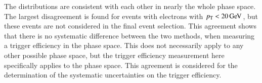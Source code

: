 The distributions are consistent with each other in nearly the whole phase space. The largest disagreement is found for events with electrons with $p_{\mathrm{T}}<20\,\text{Ge\hspace{-.08em}V}$, but these events are not considered in the final event selection. This agreement shows that there is no systematic difference between the two methods, when measuring a trigger efficiency in the \ttbar phase space. This does not necessarily apply to any other possible phase space, but the trigger efficiency measurement here specifically applies to the \ttbar phase space. This agreement is considered for the determination of the systematic uncertainties on the trigger efficiency.

\begin{figure}[htbp!]
  \begin{center}
    \\

\end{center}
\end{figure}
